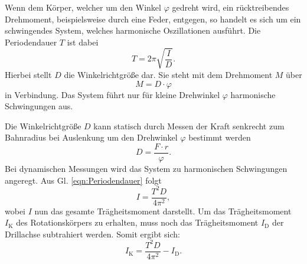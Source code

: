 Wenn dem Körper, welcher um den Winkel $\varphi$ gedreht wird,
ein rücktreibendes Drehmoment, beispielsweise durch eine Feder,
entgegen, so handelt es sich um ein schwingendes System, welches
harmonische Oszillationen ausführt. Die Periodendauer $T$ ist dabei
\begin{equation}
T = 2\pi \sqrt{\frac{I}{D}}.
\label{eqn:Periodendauer}
\end{equation}
Hierbei stellt $D$ die Winkelrichtgröße dar. Sie steht mit
dem Drehmoment $M$ über
\begin{equation}
M = D \cdot \varphi
\end{equation}
in Verbindung. Das System führt nur für kleine
Drehwinkel $\varphi$ harmonische Schwingungen aus.
\par
Die Winkelrichtgröße $D$ kann statisch durch Messen der Kraft
senkrecht zum Bahnradius bei Auslenkung um den Drehwinkel $\varphi$
bestimmt werden
\begin{equation}
\label{eqn:winkelrichtgroeße}
D = \frac{F \cdot r}{\varphi}.
\end{equation}
Bei dynamischen Messungen wird das System zu harmonischen
Schwingungen angeregt. Aus Gl. \eqref{eqn:Periodendauer} folgt
\begin{equation*}
I = \frac{T^2D}{4\pi^2},
\end{equation*}
wobei $I$ nun das gesamte Trägheitsmoment darstellt. Um das
Trägheitsmoment $I_{\text{K}}$ des Rotationskörpers zu erhalten,
muss noch das Trägheitsmoment $I_{\text{D}}$ der Drillachse
subtrahiert werden. Somit ergibt sich:
\begin{equation}
  \label{eqn:taegheitsmoment}
I_{\text{K}} = \frac{T^2D}{4\pi^2} - I_{\text{D}}.
\end{equation}


\cite{sample}
